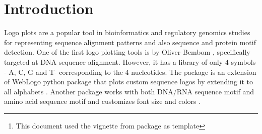 \documentclass[12pt]{article}\usepackage[]{graphicx}\usepackage[usenames,dvipsnames]{color}
\author{Kushal K Dey \\[1em]
\small{\textit{Stephens Lab}, Dept. of Statistics, The University of Chicago} \mbox{ }\\
\small{\texttt{$^*$Correspondending Email: kkdey@uchicago.edu}}}
\newcommand{\Logolas}{\textit{Logolas}}
\begin{document}
\maketitle

\begin{abstract}
\vspace{1em}
Logo plots are popular in genomic studies for sequence alignment and motif detection. However, logos have been pretty restrictive in its scope because of limited library of symbols it uses and the lack of flexibility in extending it to other applications. In this package, we provide an easy and more flexible interface for the user to plot logos and more importantly, we extend the library of logos from A, C, T, G (as in seqLogo) and English alphabets (RWebLogo) to include numbers and alpha-numeric strings with provision for punctuations and arrows. It also provides the user with a simple interface to create her own logo and add to her personal library.
In this vignette, we discuss a number of applications beyond sequence alignment where such flexible logo plots can be used.

\vspace{1em}
\textbf{\Logolas{} version:} 0.1.0 \footnote{This document used the vignette from \Bioconductor{} package  as  template}
\end{abstract}



\newpage

\tableofcontents

\section{Introduction}

Logo plots are a popular tool in bioinformatics and regulatory genomics studies for representing sequence alignment patterns and also sequence and protein motif detection. One of the first logo plotting tools is  by Oliver Bembom \cite{Bembom2016}, specifically targeted at DNA sequence alignment. However, it has a library of only 4 symbols - A, C, G and T- corresponding to the 4 nucleotides. The package  is an extension of WebLogo python package that plots custom sequence logos by extending it to all alphabets \cite{Wagih2014}. Another package  works with both DNA/RNA sequence motif and amino acid sequence motif and customizes font size and colors \cite{Ou2015}.
\end{document}
